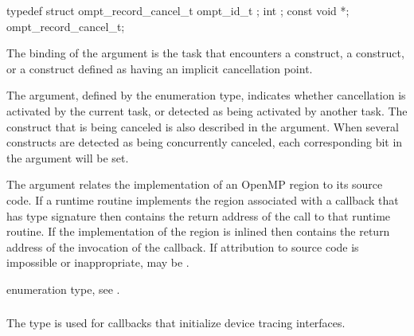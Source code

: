 \record
\begin{ccppspecific}
\begin{omptRecord}
typedef struct ompt_record_cancel_t {
  ompt_id_t ;
  int ;
  const void *;
} ompt_record_cancel_t;
\end{omptRecord}
\end{ccppspecific}



\argdesc
The binding of the  argument is the task that encounters a 
 construct, a  construct, or a construct 
defined as having an implicit cancellation point.

The  argument, defined by the  enumeration
type, indicates whether cancellation is activated by the current task, or detected 
as being activated by another task. The construct that is being canceled is also 
described in the  argument. When several constructs are detected as being
concurrently canceled, each corresponding bit in the argument will be set.

The  argument relates the implementation of an OpenMP region
to its source code. If a runtime routine implements the region associated with
a callback that has type signature  then
 contains the return address of the call to that runtime routine.
If the implementation of the region is inlined then  contains the
return address of the invocation of the callback. If attribution to source code
is impossible or inappropriate,  may be .

\begin{crossrefs}
\item {} enumeration type, see .
\end{crossrefs}



\subsubsection{}
\label{sec:ompt_callback_device_initialize_t}

\summary 
The  type is used for callbacks that 
initialize device tracing interfaces.

